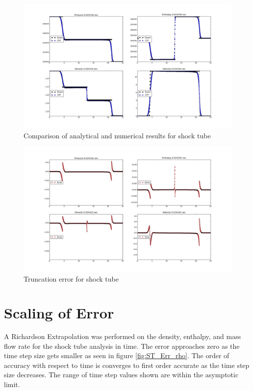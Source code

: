     \pagebreak
    \begin{figure}[!h]
    	\centering
    	\includegraphics[width=1.30\textwidth,angle=90.0]{images/wave1_200dP_N1000/tmp/plot_shocktube_0034}
    	\caption{Comparison of analytical and numerical results for shock tube}
    	\label{fig:V2_result_top}
    \end{figure}
    
    \pagebreak
    \begin{figure}[!h]
    	\centering
    	\includegraphics[width=1.30\textwidth,angle=90.0]{images/wave1_200dP_N1000/tmp/plot_st_err_0679}
    	\caption{Truncation error for shock tube}
    	\label{fig:V2_result_bottom}
    \end{figure}
    
    \pagebreak
    \section{Scaling of Error}
    
    A Richardson Extrapolation was performed on the density, enthalpy, and mass
    flow rate for the shock tube analysis in time. The error approaches zero
    as the time step size gets smaller as seen in figure
    \ref{fig:ST_Err_rho}. The order of accuracy with respect to time is
    converges to first order accurate as the time step size decreases. The range
    of time step values shown are within the asymptotic limit. 
    

